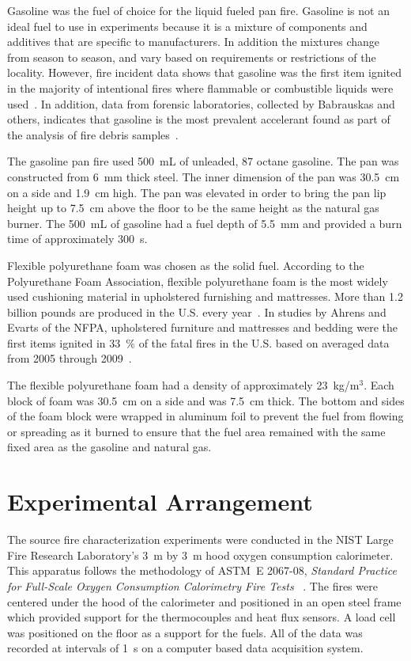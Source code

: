 \documentclass[twoside]{uocthesis}
\begin{document}
{Gasoline was the fuel of choice for the liquid fueled pan fire.  Gasoline is not an ideal fuel to use in experiments because it is a mixture of components and additives that are specific to manufacturers. In addition the mixtures change from season to season, and vary based on requirements or restrictions of the locality.  However, fire incident data shows that gasoline was the first item ignited in the majority of intentional fires where flammable or combustible liquids were used~\cite{Rohr:2001}. In addition, data from forensic laboratories, collected by Babrauskas and others, indicates that gasoline is the most prevalent accelerant found as part of the analysis of fire debris samples~\cite{Babrauskas:2003,Chasteen:2010}.

The gasoline pan fire used 500~mL of unleaded, 87 octane gasoline.  The pan was constructed from 6~mm thick steel.  The inner dimension of the pan was 30.5~cm on a side and 1.9~cm high.  The pan was elevated in order to bring the pan lip height up to 7.5~cm above the floor to be the same height as the natural gas burner.  The 500~mL of gasoline had a fuel depth of 5.5~mm and provided a burn time of approximately 300~s.

Flexible polyurethane foam was chosen as the solid fuel. According to the Polyurethane Foam Association, flexible polyurethane foam is the most widely used cushioning material in upholstered furnishing and mattresses. More than 1.2 billion pounds are produced in the U.S. every year~\cite{Foam,Polyurethane_Foam}. In studies by Ahrens and Evarts of the NFPA, upholstered furniture and mattresses and bedding were the first items ignited in 33~\% of the fatal fires in the U.S. based on averaged data from 2005 through 2009~\cite{Ahrens:2011,Evarts:2011}.

The flexible polyurethane foam had a density of approximately 23~kg/m$^3$.  Each block of foam was 30.5~cm on a side and was 7.5~cm thick. The bottom and sides of the foam block were wrapped in aluminum foil to prevent the fuel from flowing or spreading as it burned to ensure that the fuel area remained with the same fixed area as the gasoline and natural gas.

\section{Experimental Arrangement}

The source fire characterization experiments were conducted in the NIST Large Fire Research Laboratory's 3~m by 3~m hood oxygen consumption calorimeter. This apparatus follows the methodology of ASTM~E 2067-08, {\em Standard Practice for Full-Scale Oxygen Consumption Calorimetry Fire Tests} ~\cite{ASTM_E2067}. The fires were centered under the hood of the calorimeter and positioned in an open steel frame which provided support for the thermocouples and heat flux sensors. A load cell was positioned on the floor as a support for the fuels.  All of the data was recorded at intervals of 1~s on a computer based data acquisition system.

}
\end{document}

